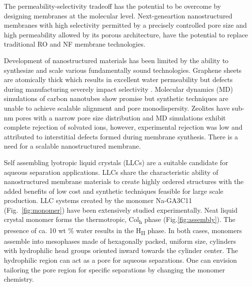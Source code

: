 \documentclass{article}
\begin{document}
  The permeability-selectivity tradeoff has the potential to be overcome by
  designing membranes at the molecular level. Next-geneartion nanostructured
  membranes with high selectivity permitted by a precisely controlled pore size
  and high permeability allowed by its porous architecture, have the potential to
  replace traditional RO and NF membrane technologies. 


  Development of nanostructured materials has been limited by the ability to
  synthesize and scale various fundamentally sound technologies. Graphene sheets
  are atomically thick which results in excellent water permeability but defects
  during manufacturing severely impact selectivity
  \cite{cohen-tanugi_multilayer_2016}. Molecular dynamics (MD) simulations of carbon
  nanotubes show promise \cite{humplik_nanostructured_2011} but synthetic
  techniques are unable to achieve scalable alignment and pore monodispersity.
  \cite{hata_water-assisted_2004,maruyama_growth_2005} Zeolites have sub-nm pores
  with a narrow pore size distribution and MD simulations exhibit complete
  rejection of solvated ions, \cite{murad_molecular_1998} however, experimental
  rejection was low and attributed to interstitial defects formed during membrane
  synthesis. \cite{li_desalination_2004} There is a need for a scalable
  nanostructured membrane. 

  Self assembling lyotropic liquid crystals (LLCs) are a suitable candidate for
  aqueous separation applications. LLCs share the characteristic ability of
  nanostructured membrane materials to create highly ordered structures with the
  added benefits of low cost and synthetic techniques feasible for large scale
  production.  \cite{feng_scalable_2014} LLC systems created by the monomer 
  Na-GA3C11 (Fig.~\ref{fig:monomer}) have been extensively studied experimentally.
  \cite{smith_ordered_1997,zhou_supported_2005,resel_h2-phase_2000,feng_scalable_2014,feng_thin_2016}
  Neat liquid crystal monomer forms the thermotropic, Col\textsubscript{h}
  phase (Fig.\ref{fig:assembly}). The presence of ca. 10 wt \% water results in the
  H\textsubscript{II} phase. In both cases, monomers assemble into mesophases
  made of hexagonally packed, uniform size, cylinders with hydrophilic head
  groups oriented inward towards the cylinder center.  The hydrophilic region can
  act as a pore for aqueous separations.  One can envision tailoring the pore
  region for specific separations by changing the monomer chemistry.
\end{document}
